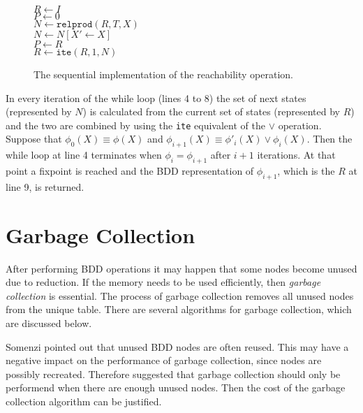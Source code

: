 \begin{figure}
	\centering
	\begin{algorithm}[H]
		\SetStartEndCondition{ }{}{}%
		\AlgoDontDisplayBlockMarkers\SetAlgoNoEnd\SetAlgoNoLine%

		 {
			$R \gets I$ \\
			$P \gets 0$ \\
			 {
				$N \gets \texttt{relprod}(R, T, X)$ \\
				$N \gets N[X' \gets X]$ \\
				$P \gets R$ \\
				$R \gets \texttt{ite}(R, 1, N)$
			}
		}
	\end{algorithm}

	\caption{The sequential implementation of the reachability operation.}
	\label{fig:reach_seq}
\end{figure}

In every iteration of the while loop (lines 4 to 8) the set of next states (represented by $N$) is calculated from the current set of states (represented by $R$) and the two are combined by using the \texttt{ite} equivalent of the $\vee$ operation. Suppose that $\phi_0(X) \equiv \phi(X)$ and $\phi_{i+1}(X) \equiv \phi'_i(X) \vee \phi_i(X)$. Then the while loop at line 4 terminates when $\phi_{i} = \phi_{i+1}$ after $i+1$ iterations. At that point a fixpoint is reached and the BDD representation of $\phi_{i+1}$, which is the $R$ at line 9, is returned.

\section{Garbage Collection}
After performing BDD operations it may happen that some nodes become unused due to reduction. If the memory needs to be used efficiently, then \emph{garbage collection} is essential. The process of garbage collection removes all unused nodes from the unique table. There are several algorithms for garbage collection, which are discussed below. 

Somenzi \cite{somenzi2001efficient} pointed out that unused BDD nodes are often reused. This may have a negative impact on the performance of garbage collection, since nodes are possibly recreated. Therefore \cite{somenzi2001efficient} suggested that garbage collection should only be performend when there are enough unused nodes. Then the cost of the garbage collection algorithm can be justified.

